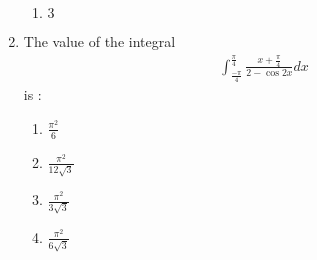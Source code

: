 \documentclass[journal]{IEEEtran}
\begin{document}
\begin{enumerate}
\begin{enumerate}
			\item $3$
        	\end{enumerate}
	\item The value of the integral 
             \begin{align*}
		\int_\frac{-\pi}{4}^\frac{\pi}{4}\frac{x+\frac{\pi}{4}}{2-\cos 2x}dx
             \end{align*}
	     is :
		\begin{enumerate}
			\item $\frac{\pi^2}{6}$
			\item $\frac{\pi^2}{12\sqrt{3}}$
	         	\item $\frac{\pi^2}{3\sqrt{3}}$
                 	\item $\frac{\pi^2}{6\sqrt{3}}$
	\end{enumerate}	
\end{enumerate}		
\end{document}
